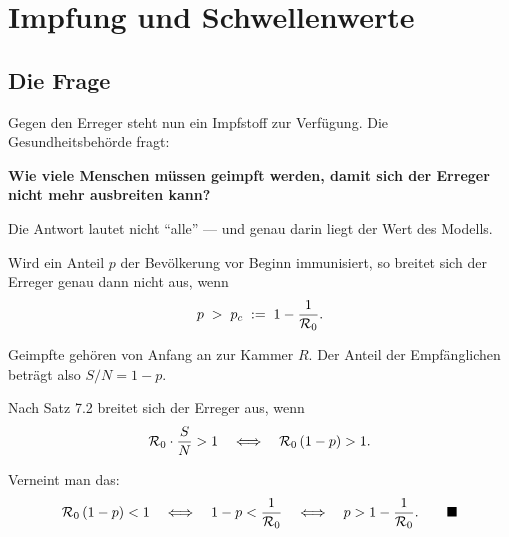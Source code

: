 \chapter{Impfung und Schwellenwerte}

\section{Die Frage}

\begin{merksatz}
Gegen den Erreger steht nun ein Impfstoff zur Verfügung. Die Gesundheitsbehörde fragt:

\begin{center}
\begin{minipage}{0.9\textwidth}
\textbf{Wie viele Menschen müssen geimpft werden, damit sich der Erreger nicht mehr ausbreiten kann?}
\end{minipage}
\end{center}

Die Antwort lautet nicht \enquote{alle} --- und genau darin liegt der Wert des Modells.
\end{merksatz}

\begin{merksatz}
Wird ein Anteil $p$ der Bevölkerung vor Beginn immunisiert, so breitet sich der Erreger genau dann nicht aus, wenn
\[ p \;>\; p_c \;:=\; 1 - \frac{1}{\mathcal{R}_0} . \]

Geimpfte gehören von Anfang an zur Kammer $R$. Der Anteil der Empfänglichen beträgt also $S/N = 1-p$.

Nach Satz 7.2 breitet sich der Erreger aus, wenn
\[ \mathcal{R}_0\cdot\frac{S}{N} > 1 \quad\Longleftrightarrow\quad \mathcal{R}_0\,(1-p) > 1 . \]

Verneint man das:
\[ \mathcal{R}_0\,(1-p) < 1 \quad\Longleftrightarrow\quad 1-p < \frac{1}{\mathcal{R}_0} \quad\Longleftrightarrow\quad p > 1 - \frac{1}{\mathcal{R}_0} . \qquad \blacksquare \]
\end{merksatz}

